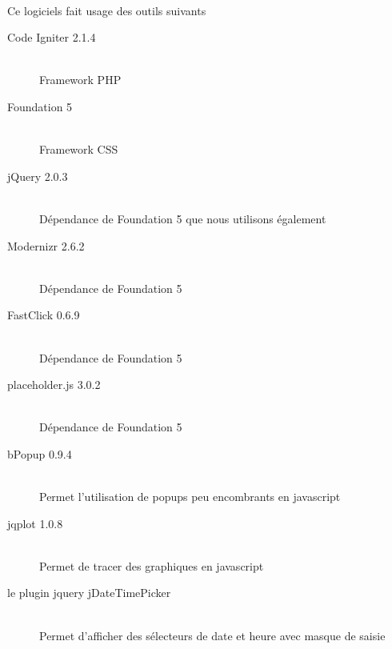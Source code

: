     \paragraph{}
        Ce logiciels fait usage des outils suivants
        \begin{description}
            \item[Code Igniter 2.1.4]\hfill \\
                Framework PHP
            \item[Foundation 5]\hfill \\
                Framework CSS
            \item[jQuery 2.0.3]\hfill \\
                Dépendance de Foundation 5 que nous utilisons également
            \item[Modernizr 2.6.2]\hfill \\
                Dépendance de Foundation 5
            \item[FastClick 0.6.9]\hfill \\
                Dépendance de Foundation 5
            \item[placeholder.js 3.0.2]\hfill \\
                Dépendance de Foundation 5
            \item[bPopup 0.9.4]\hfill \\
                Permet l’utilisation de popups peu encombrants en javascript
            \item[jqplot 1.0.8]\hfill \\
                Permet de tracer des graphiques en javascript
            \item[le plugin jquery jDateTimePicker]\hfill \\
                Permet d'afficher des sélecteurs de date et heure avec masque de saisie
        \end{description}